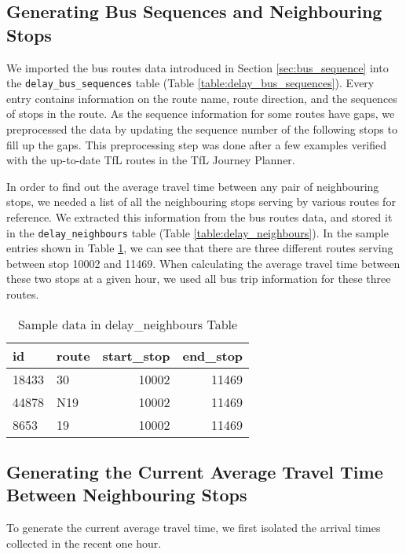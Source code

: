 \subsection{Generating Bus Sequences and Neighbouring Stops}
\label{sec:bus_stop_locations_routes}
\par We imported the bus routes data introduced in Section \ref{sec:bus_sequence} into the \texttt{delay\_bus\_sequences} table (Table \ref{table:delay_bus_sequences}). Every entry contains information on the route name, route direction, and the sequences of stops in the route. As the sequence information for some routes have gaps, we preprocessed the data by updating the sequence number of the following stops to fill up the gaps. This preprocessing step was done after a few examples verified with the up-to-date TfL routes in the TfL Journey Planner.

\par In order to find out the average travel time between any pair of neighbouring stops, we needed a list of all the neighbouring stops serving by various routes for reference. We extracted this information from the bus routes data, and stored it in the \texttt{delay\_neighbours} table (Table \ref{table:delay_neighbours}). In the sample entries shown in Table \ref{table:sample_neighbours_view}, we can see that there are three different routes serving between stop 10002 and 11469. When calculating the average travel time between these two stops at a given hour, we used all bus trip information for these three routes.

\begin{table}
\centering
\begin{tabular}{@{}llrr@{}} \toprule
id & route & start\_stop & end\_stop \\ \midrule
18433 & 30 & 10002 & 11469 \\
44878 & N19 & 10002 & 11469 \\
8653 & 19 & 10002 & 11469 \\ \bottomrule
\end{tabular}
\caption{Sample data in delay\_neighbours Table}
\label{table:sample_neighbours_view}
\end{table}

\subsection{Generating the Current Average Travel Time Between Neighbouring Stops}
\par To generate the current average travel time, we first isolated the arrival times collected in the recent one hour.

